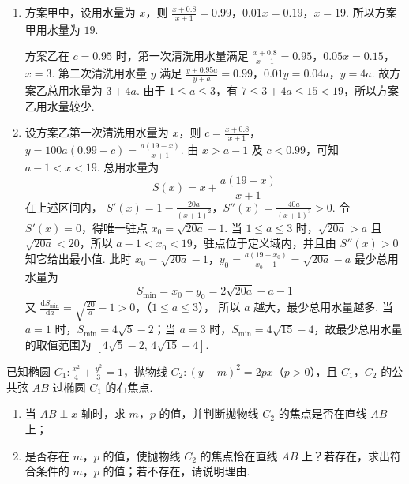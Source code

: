 \begin{solution}
\begin{enumerate}
\item 方案甲中，设用水量为 \(x\)，则
\(\frac{x+0.8}{x+1}=0.99\)，\(0.01x=0.19\)，\(x=19\).
所以方案甲用水量为 \(19\).

方案乙在 \(c=0.95\) 时，第一次清洗用水量满足
\(\frac{x+0.8}{x+1}=0.95\)，\(0.05x=0.15\)，\(x=3\).
第二次清洗用水量 \(y\) 满足
\(\frac{y+0.95a}{y+a}=0.99\)，\(0.01y=0.04a\)，\(y=4a\).
故方案乙总用水量为 \(3+4a\). 由于 \(1\leqslant a\leqslant3\)，有 \(7\leqslant3+4a\leqslant15<19\)，所以方案乙用水量较少.

\item 设方案乙第一次清洗用水量为 \(x\)，则
\(c=\frac{x+0.8}{x+1}\)，\(y=100a(0.99-c)=\frac{a(19-x)}{x+1}\).
由 \(x>a-1\) 及 \(c<0.99\)，可知 \(a-1<x<19\). 总用水量为
\[
S(x)=x+\frac{a(19-x)}{x+1}
\]
在上述区间内，
\(S'(x)=1-\frac{20a}{(x+1)^2}\)，\(S''(x)=\frac{40a}{(x+1)^3}>0\).
令 \(S'(x)=0\)，得唯一驻点 \(x_0=\sqrt{20a}-1\). 当 \(1\leqslant a\leqslant3\) 时，\(\sqrt{20a}>a\) 且 \(\sqrt{20a}<20\)，所以 \(a-1<x_0<19\)，驻点位于定义域内，并且由 \(S''(x)>0\) 知它给出最小值. 此时
\(x_0=\sqrt{20a}-1\)，\(y_0=\frac{a(19-x_0)}{x_0+1}=\sqrt{20a}-a\)
最少总用水量为
\[
S_{\min}=x_0+y_0=2\sqrt{20a}-a-1
\]
又
\(\frac{\mathrm dS_{\min}}{\mathrm da}=\sqrt{\frac{20}{a}}-1>0\)，（\(1\leqslant a\leqslant3\)），
所以 \(a\) 越大，最少总用水量越多. 当 \(a=1\) 时，\(S_{\min}=4\sqrt{5}-2\)；当 \(a=3\) 时，\(S_{\min}=4\sqrt{15}-4\)，故最少总用水量的取值范围为 \([4\sqrt{5}-2,\,4\sqrt{15}-4]\).
\end{enumerate}
\end{solution}

\begin{problem}
已知椭圆 \(C_{1}: \frac{x^2}{4} + \frac{y^2}{3} = 1\)，抛物线 \(C_{2}: (y - m)^2 = 2px\)（\(p > 0\)），且 \(C_{1}\)，\(C_{2}\) 的公共弦 \(AB\) 过椭圆 \(C_{1}\) 的右焦点.

\begin{enumerate}
\item 当 \(AB \perp x\) 轴时，求 \(m\)，\(p\) 的值，并判断抛物线 \(C_{2}\) 的焦点是否在直线 \(AB\) 上；
\item 是否存在 \(m\)，\(p\) 的值，使抛物线 \(C_{2}\) 的焦点恰在直线 \(AB\) 上？若存在，求出符合条件的 \(m\)，\(p\) 的值；若不存在，请说明理由.
\end{enumerate}
\end{problem}

